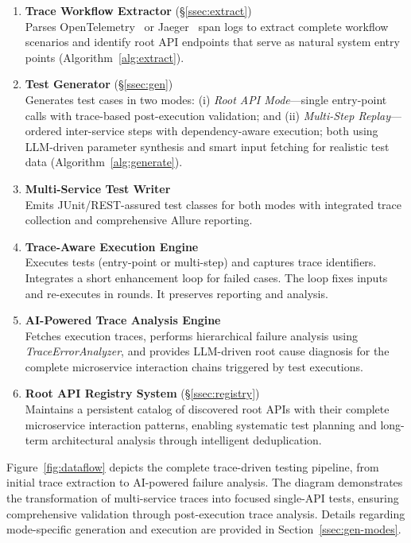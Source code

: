 \documentclass[conference]{IEEEtran}
\begin{document}
\begin{enumerate}[leftmargin=*]
  \item \textbf{Trace Workflow Extractor}  
        \hfill(\S\ref{ssec:extract})\\
        Parses OpenTelemetry~\cite{opentelemetry} or Jaeger~\cite{jaeger2017} span logs to extract complete workflow scenarios
        and identify root API endpoints that serve as natural system entry points (Algorithm~\ref{alg:extract}).
  \item \textbf{Test Generator}  
        \hfill(\S\ref{ssec:gen})\\
        Generates test cases in two modes: (i) \emph{Root API Mode}—single entry-point calls with
        trace-based post-execution validation; and (ii) \emph{Multi-Step Replay}—ordered inter-service
        steps with dependency-aware execution; both using LLM-driven parameter synthesis and
        smart input fetching for realistic test data (Algorithm~\ref{alg:generate}).
  \item \textbf{Multi-Service Test Writer}\\
        Emits JUnit/REST-assured test classes for both modes with
        integrated trace collection and comprehensive Allure reporting.
  \item \textbf{Trace-Aware Execution Engine}\\
        Executes tests (entry-point or multi-step) and captures trace identifiers. Integrates a short enhancement loop for failed cases. The loop fixes inputs and re-executes in rounds. It preserves reporting and analysis.
  \item \textbf{AI-Powered Trace Analysis Engine}\\
        Fetches execution traces, performs hierarchical failure analysis using
        \textit{TraceErrorAnalyzer}, and provides LLM-driven root cause diagnosis
        for the complete microservice interaction chains triggered by test executions.
  \item \textbf{Root API Registry System}  
        \hfill(\S\ref{ssec:registry})\\
        Maintains a persistent catalog of discovered root APIs with their complete
        microservice interaction patterns, enabling systematic test planning and
        long-term architectural analysis through intelligent deduplication.
\end{enumerate}




\noindent%
Figure~\ref{fig:dataflow} depicts the complete trace-driven testing pipeline, from initial trace extraction to AI-powered failure analysis. The diagram demonstrates the transformation of multi-service traces into focused single-API tests, ensuring comprehensive validation through post-execution trace analysis. Details regarding mode-specific generation and execution are provided in Section~\ref{ssec:gen-modes}.
\end{document}

